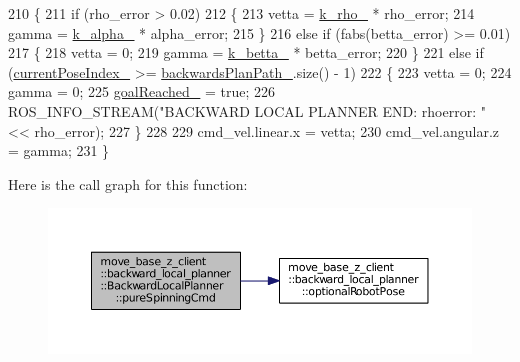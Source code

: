 \begin{DoxyCode}
210 \{
211     \textcolor{keywordflow}{if} (rho\_error > 0.02)
212     \{
213         vetta = \hyperlink{classmove__base__z__client_1_1backward__local__planner_1_1BackwardLocalPlanner_a9ae9a8c4c4663a999ba107aea9f6868d}{k\_rho\_} * rho\_error;
214         gamma = \hyperlink{classmove__base__z__client_1_1backward__local__planner_1_1BackwardLocalPlanner_ac859500c0329247de08daf864fd2d4b1}{k\_alpha\_} * alpha\_error;
215     \}
216     \textcolor{keywordflow}{else} \textcolor{keywordflow}{if} (fabs(betta\_error) >= 0.01)
217     \{
218         vetta = 0;
219         gamma = \hyperlink{classmove__base__z__client_1_1backward__local__planner_1_1BackwardLocalPlanner_aa2f7fe022cdc4eb11c17f6f576c732c6}{k\_betta\_} * betta\_error;
220     \}
221     \textcolor{keywordflow}{else} \textcolor{keywordflow}{if} (\hyperlink{classmove__base__z__client_1_1backward__local__planner_1_1BackwardLocalPlanner_af304b2e7cde744ad905a1ae7889102b6}{currentPoseIndex\_} >= \hyperlink{classmove__base__z__client_1_1backward__local__planner_1_1BackwardLocalPlanner_a451add2af7d6d83a7415277311b3ed04}{backwardsPlanPath\_}.size() - 1)
222     \{
223         vetta = 0;
224         gamma = 0;
225         \hyperlink{classmove__base__z__client_1_1backward__local__planner_1_1BackwardLocalPlanner_a0a89141d3d3a8ebfb9e1d69d0d33fd49}{goalReached\_} = \textcolor{keyword}{true};
226         ROS\_INFO\_STREAM(\textcolor{stringliteral}{"BACKWARD LOCAL PLANNER END: rhoerror: "} << rho\_error);
227     \}
228 
229     cmd\_vel.linear.x = vetta;
230     cmd\_vel.angular.z = gamma;
231 \}
\end{DoxyCode}


Here is the call graph for this function\+:
\nopagebreak
\begin{figure}[H]
\begin{center}
\leavevmode
\includegraphics[width=350pt]{classmove__base__z__client_1_1backward__local__planner_1_1BackwardLocalPlanner_a3b08865dc8e19750273d971336ecba3b_cgraph}
\end{center}
\end{figure}




